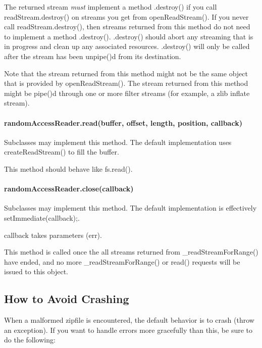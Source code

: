 The returned stream {\itshape must} implement a method {\ttfamily .destroy()} if you call {\ttfamily read\+Stream.\+destroy()} on streams you get from {\ttfamily open\+Read\+Stream()}. If you never call {\ttfamily read\+Stream.\+destroy()}, then streams returned from this method do not need to implement a method {\ttfamily .destroy()}. {\ttfamily .destroy()} should abort any streaming that is in progress and clean up any associated resources. {\ttfamily .destroy()} will only be called after the stream has been {\ttfamily unpipe()}d from its destination.

Note that the stream returned from this method might not be the same object that is provided by {\ttfamily open\+Read\+Stream()}. The stream returned from this method might be {\ttfamily pipe()}d through one or more filter streams (for example, a zlib inflate stream).

\paragraph*{random\+Access\+Reader.\+read(buffer, offset, length, position, callback)}

Subclasses may implement this method. The default implementation uses {\ttfamily create\+Read\+Stream()} to fill the {\ttfamily buffer}.

This method should behave like {\ttfamily fs.\+read()}.

\paragraph*{random\+Access\+Reader.\+close(callback)}

Subclasses may implement this method. The default implementation is effectively {\ttfamily set\+Immediate(callback);}.

{\ttfamily callback} takes parameters {\ttfamily (err)}.

This method is called once the all streams returned from {\ttfamily \+\_\+read\+Stream\+For\+Range()} have ended, and no more {\ttfamily \+\_\+read\+Stream\+For\+Range()} or {\ttfamily read()} requests will be issued to this object.

\subsection*{How to Avoid Crashing}

When a malformed zipfile is encountered, the default behavior is to crash (throw an exception). If you want to handle errors more gracefully than this, be sure to do the following\+:


